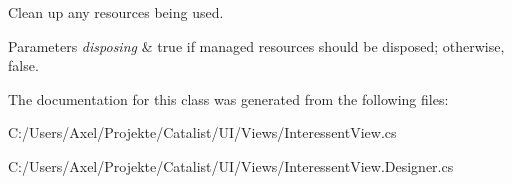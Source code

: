 Clean up any resources being used. 


\begin{DoxyParams}{Parameters}
{\em disposing} & true if managed resources should be disposed; otherwise, false.\\
\hline
\end{DoxyParams}


The documentation for this class was generated from the following files\+:\begin{DoxyCompactItemize}
\item 
C\+:/\+Users/\+Axel/\+Projekte/\+Catalist/\+U\+I/\+Views/Interessent\+View.\+cs\item 
C\+:/\+Users/\+Axel/\+Projekte/\+Catalist/\+U\+I/\+Views/Interessent\+View.\+Designer.\+cs\end{DoxyCompactItemize}
